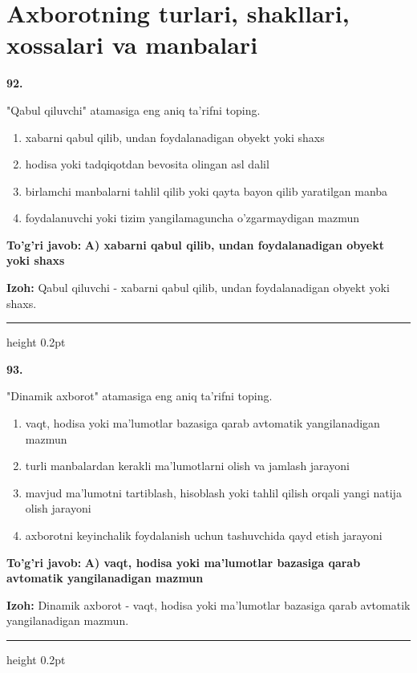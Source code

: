 \documentclass[10pt,a4paper,oneside]{article}
\begin{document}
\section{Axborotning turlari, shakllari, xossalari va manbalari}

\noindent\textbf{\color{ink}92.}
\par
"Qabul qiluvchi" atamasiga eng aniq ta'rifni toping.
\begin{enumerate}[label=\Alph*),leftmargin=9mm]
\item xabarni qabul qilib, undan foydalanadigan obyekt yoki shaxs
\item hodisa yoki tadqiqotdan bevosita olingan asl dalil
\item birlamchi manbalarni tahlil qilib yoki qayta bayon qilib yaratilgan manba
\item foydalanuvchi yoki tizim yangilamaguncha o'zgarmaydigan mazmun
\end{enumerate}
\begin{tcolorbox}[enhanced,breakable,colback=teal!4,colframe=teal!50!black,boxrule=0.5pt,arc=1.1mm,left=3mm,right=3mm,top=1.7mm,bottom=1.7mm,before skip=2mm,after skip=2mm]
\textbf{\color{teal}To'g'ri javob:} \textbf{A) xabarni qabul qilib, undan foydalanadigan obyekt yoki shaxs}
\par\smallskip
\textbf{Izoh:} Qabul qiluvchi - xabarni qabul qilib, undan foydalanadigan obyekt yoki shaxs.
\end{tcolorbox}
\vspace{2mm}\hrule height 0.2pt \vspace{3mm}

\noindent\textbf{\color{ink}93.}
\par
"Dinamik axborot" atamasiga eng aniq ta'rifni toping.
\begin{enumerate}[label=\Alph*),leftmargin=9mm]
\item vaqt, hodisa yoki ma'lumotlar bazasiga qarab avtomatik yangilanadigan mazmun
\item turli manbalardan kerakli ma'lumotlarni olish va jamlash jarayoni
\item mavjud ma'lumotni tartiblash, hisoblash yoki tahlil qilish orqali yangi natija olish jarayoni
\item axborotni keyinchalik foydalanish uchun tashuvchida qayd etish jarayoni
\end{enumerate}
\begin{tcolorbox}[enhanced,breakable,colback=teal!4,colframe=teal!50!black,boxrule=0.5pt,arc=1.1mm,left=3mm,right=3mm,top=1.7mm,bottom=1.7mm,before skip=2mm,after skip=2mm]
\textbf{\color{teal}To'g'ri javob:} \textbf{A) vaqt, hodisa yoki ma'lumotlar bazasiga qarab avtomatik yangilanadigan mazmun}
\par\smallskip
\textbf{Izoh:} Dinamik axborot - vaqt, hodisa yoki ma'lumotlar bazasiga qarab avtomatik yangilanadigan mazmun.
\end{tcolorbox}
\vspace{2mm}\hrule height 0.2pt \vspace{3mm}
\end{document}
